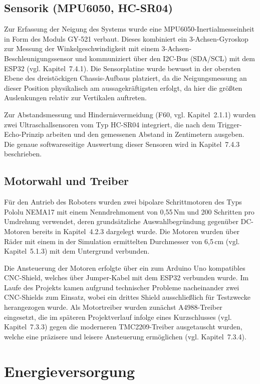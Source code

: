 \documentclass[12pt,ngerman,numbers=noenddot,abstracton,headsepline]{scrreprt}
\begin{document}
\subsection{Sensorik (MPU6050, HC-SR04)}
\label{subsec:sensorik_komponente}

Zur Erfassung der Neigung des Systems wurde eine MPU6050-Inertialmesseinheit in Form des Moduls GY-521 verbaut. Dieses kombiniert ein 3-Achsen-Gyroskop zur Messung der Winkelgeschwindigkeit mit einem 3-Achsen-Beschleunigungssensor und kommuniziert über den I2C-Bus (SDA/SCL) mit dem ESP32 (vgl. Kapitel~7.4.1). Die Sensorplatine wurde bewusst in der obersten Ebene des dreistöckigen Chassis-Aufbaus platziert, da die Neigungsmessung an dieser Position physikalisch am aussagekräftigsten erfolgt, da hier die größten Auslenkungen relativ zur Vertikalen auftreten.

Zur Abstandsmessung und Hindernisvermeidung (F60, vgl. Kapitel~2.1.1) wurden zwei Ultraschallsensoren vom Typ HC-SR04 integriert, die nach dem Trigger-Echo-Prinzip arbeiten und den gemessenen Abstand in Zentimetern ausgeben. Die genaue softwareseitige Auswertung dieser Sensoren wird in Kapitel~7.4.3 beschrieben.

\subsection{Motorwahl und Treiber}
\label{subsec:motorwahl_treiber}

Für den Antrieb des Roboters wurden zwei bipolare Schrittmotoren des Typs Pololu NEMA17 mit einem Nenndrehmoment von 0,55\,Nm und 200 Schritten pro Umdrehung verwendet, deren grundsätzliche Auswahlbegründung gegenüber DC-Motoren bereits in Kapitel~4.2.3 dargelegt wurde. Die Motoren wurden über Räder mit einem in der Simulation ermittelten Durchmesser von 6,5\,cm (vgl. Kapitel~5.1.3) mit dem Untergrund verbunden.

Die Ansteuerung der Motoren erfolgte über ein zum Arduino Uno kompatibles CNC-Shield, welches über Jumper-Kabel mit dem ESP32 verbunden wurde. Im Laufe des Projekts kamen aufgrund technischer Probleme nacheinander zwei CNC-Shields zum Einsatz, wobei ein drittes Shield ausschließlich für Testzwecke herangezogen wurde. Als Motortreiber wurden zunächst A4988-Treiber eingesetzt, die im späteren Projektverlauf infolge eines Kurzschlusses (vgl. Kapitel~7.3.3) gegen die moderneren TMC2209-Treiber ausgetauscht wurden, welche eine präzisere und leisere Ansteuerung ermöglichen (vgl. Kapitel~7.3.4).

\section{Energieversorgung}
\label{sec:energieversorgung}
\end{document}
